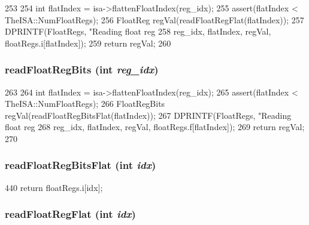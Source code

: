 \begin{DoxyCode}
253     {
254         int flatIndex = isa->flattenFloatIndex(reg_idx);
255         assert(flatIndex < TheISA::NumFloatRegs);
256         FloatReg regVal(readFloatRegFlat(flatIndex));
257         DPRINTF(FloatRegs, "Reading float reg %
258                 reg_idx, flatIndex, regVal, floatRegs.i[flatIndex]);
259         return regVal;
260     }
\end{DoxyCode}
\hypertarget{classSimpleThread_a4998e6615f835676762af364eff198e3}{
\subsubsection[{readFloatRegBits}]{ readFloatRegBits (int {\em reg\_\-idx})}}
\label{classSimpleThread_a4998e6615f835676762af364eff198e3}



\begin{DoxyCode}
263     {
264         int flatIndex = isa->flattenFloatIndex(reg_idx);
265         assert(flatIndex < TheISA::NumFloatRegs);
266         FloatRegBits regVal(readFloatRegBitsFlat(flatIndex));
267         DPRINTF(FloatRegs, "Reading float reg %
268                 reg_idx, flatIndex, regVal, floatRegs.f[flatIndex]);
269         return regVal;
270     }
\end{DoxyCode}
\hypertarget{classSimpleThread_a2fa29585c9694c9bffcce2a63f871759}{
\subsubsection[{readFloatRegBitsFlat}]{ readFloatRegBitsFlat (int {\em idx})}}
\label{classSimpleThread_a2fa29585c9694c9bffcce2a63f871759}



\begin{DoxyCode}
440 { return floatRegs.i[idx]; }
\end{DoxyCode}
\hypertarget{classSimpleThread_aaa32dc9f4a8719a465c267fed47cbdc6}{
\subsubsection[{readFloatRegFlat}]{ readFloatRegFlat (int {\em idx})}}
\label{classSimpleThread_aaa32dc9f4a8719a465c267fed47cbdc6}



